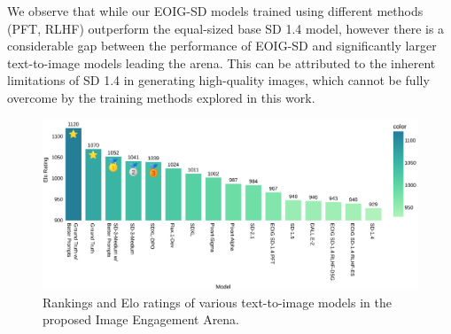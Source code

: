   
 We observe that while our EOIG-SD models trained using different methods (PFT, RLHF) outperform the equal-sized base SD 1.4 model, however there is a considerable gap between the performance of EOIG-SD and significantly larger text-to-image models leading the arena. This can be attributed to the inherent limitations of SD 1.4 in generating high-quality images, which cannot be fully overcome by the training methods explored in this work. 

 

 \begin{figure}[!t]
     \centering
     \includegraphics[width=1\textwidth]{images/image_engagement_arena.pdf}
     \caption{Rankings and Elo ratings of various text-to-image models in the proposed Image Engagement Arena. \label{img:image_engagement_arena}}
   \end{figure}
 


